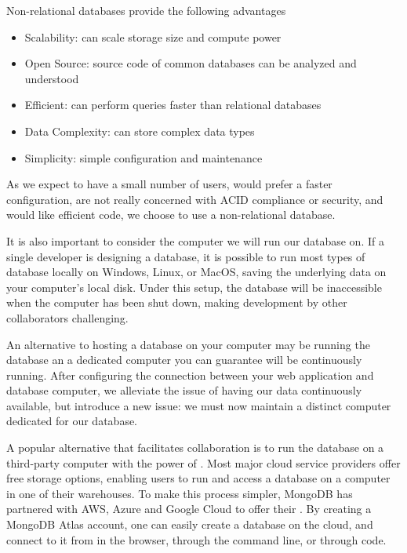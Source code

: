 Non-relational databases provide the following advantages

\begin{itemize}
    \item Scalability: can scale storage size and compute power
    \item Open Source: source code of common databases can be analyzed and understood
    \item Efficient: can perform queries faster than relational databases
    \item Data Complexity: can store complex data types
    \item Simplicity: simple configuration and maintenance 
\end{itemize}

As we expect to have a small number of users, would prefer a faster configuration, are not really concerned with ACID compliance or security, and would like efficient code, we choose to use a non-relational database. 

It is also important to consider the computer we will run our database on. If a single developer is designing a database, it is possible to run most types of database locally on Windows, Linux, or MacOS, saving the underlying data on your computer's local disk. Under this setup, the database will be inaccessible when the computer has been shut down, making development by other collaborators challenging. 

An alternative to hosting a database on your computer may be running the database an a dedicated computer you can guarantee will be continuously running. After configuring the connection between your web application and database computer, we alleviate the issue of having our data continuously available, but introduce a new issue: we must now maintain a distinct computer dedicated for our database.

A popular alternative that facilitates collaboration is to run the database on a third-party computer with the power of . Most major cloud service providers offer free storage options, enabling users to run and access a database on a computer in one of their warehouses. To make this process simpler, MongoDB has partnered with AWS, Azure and Google Cloud to offer their . By creating a MongoDB Atlas account, one can easily create a database on the cloud, and connect to it from in the browser, through the command line, or through code.

